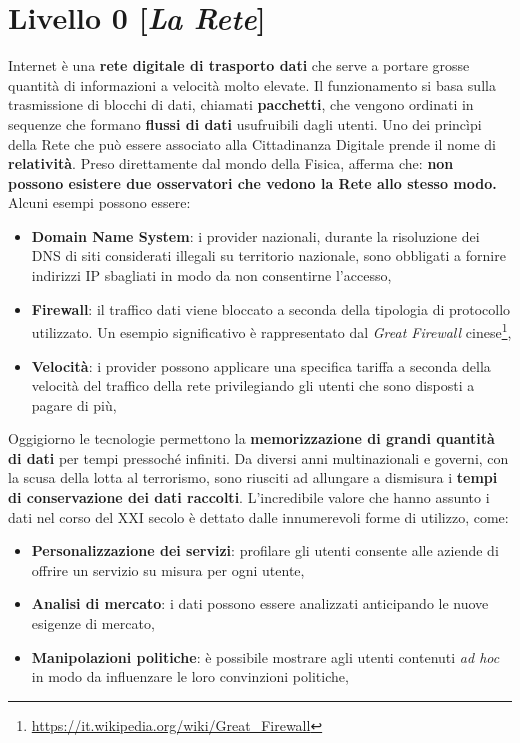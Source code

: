 \chapter{Livello 0 [\emph{La Rete}]}
Internet è una \textbf{rete digitale di trasporto dati} che serve a portare grosse quantità di informazioni a velocità molto elevate. Il funzionamento si basa sulla trasmissione di blocchi di dati, chiamati \textbf{pacchetti}, che vengono ordinati in sequenze che formano \textbf{flussi di dati} usufruibili dagli utenti.
\bigbreak
Uno dei princìpi della Rete che può essere associato alla Cittadinanza Digitale prende il nome di \textbf{relatività}. Preso direttamente dal mondo della Fisica, afferma che: \textbf{non possono esistere due osservatori che vedono la Rete allo stesso modo.}
Alcuni esempi possono essere:
\begin{itemize}
    \item \textbf{Domain Name System}: i provider nazionali, durante la risoluzione dei DNS di siti considerati illegali su territorio nazionale, sono obbligati a fornire indirizzi IP sbagliati in modo da non consentirne l'accesso,
    \item \textbf{Firewall}: il traffico dati viene bloccato a seconda della tipologia di protocollo utilizzato. Un esempio significativo è rappresentato dal \emph{Great Firewall} cinese\footnote{\url{https://it.wikipedia.org/wiki/Great_Firewall}},
    \item \textbf{Velocità}: i provider possono applicare una specifica tariffa a seconda della velocità del traffico della rete privilegiando gli utenti che sono disposti a pagare di più,
\end{itemize}
\bigbreak
Oggigiorno le tecnologie permettono la \textbf{memorizzazione di grandi quantità di dati} per tempi pressoché infiniti. Da diversi anni multinazionali e governi, con la scusa della lotta al terrorismo, sono riusciti ad allungare a dismisura i \textbf{tempi di conservazione dei dati raccolti}.
\bigbreak
L'incredibile valore che hanno assunto i dati nel corso del XXI secolo è dettato dalle innumerevoli forme di utilizzo, come:
\begin{itemize}
    \item \textbf{Personalizzazione dei servizi}: profilare gli utenti consente alle aziende di offrire un servizio su misura per ogni utente,
    \item \textbf{Analisi di mercato}: i dati possono essere analizzati anticipando le nuove esigenze di mercato,
    \item \textbf{Manipolazioni politiche}: è possibile mostrare agli utenti contenuti \emph{ad hoc} in modo da influenzare le loro convinzioni politiche,
\end{itemize}

